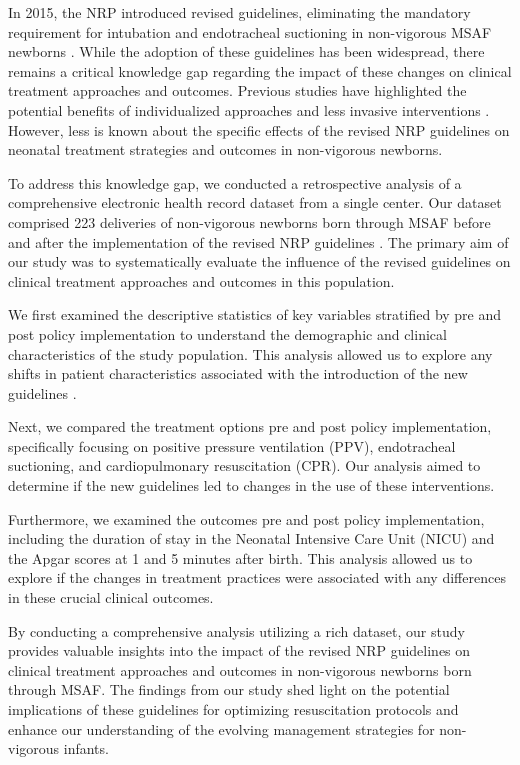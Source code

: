 \documentclass[11pt]{article}
\begin{document}
In 2015, the NRP introduced revised guidelines, eliminating the mandatory requirement for intubation and endotracheal suctioning in non-vigorous MSAF newborns \cite{Hall2005MorphineHA, Chu2014NeurologicalCA}. While the adoption of these guidelines has been widespread, there remains a critical knowledge gap regarding the impact of these changes on clinical treatment approaches and outcomes. Previous studies have highlighted the potential benefits of individualized approaches and less invasive interventions \cite{Kurland2013AnOA, Patel2013EarlyCT}. However, less is known about the specific effects of the revised NRP guidelines on neonatal treatment strategies and outcomes in non-vigorous newborns.

To address this knowledge gap, we conducted a retrospective analysis of a comprehensive electronic health record dataset from a single center. Our dataset comprised 223 deliveries of non-vigorous newborns born through MSAF before and after the implementation of the revised NRP guidelines \cite{Cutumisu2018GrowthMM, Ades2016UpdateOS}. The primary aim of our study was to systematically evaluate the influence of the revised guidelines on clinical treatment approaches and outcomes in this population.

We first examined the descriptive statistics of key variables stratified by pre and post policy implementation to understand the demographic and clinical characteristics of the study population. This analysis allowed us to explore any shifts in patient characteristics associated with the introduction of the new guidelines \cite{Vandenbussche2005TheEO, Zhang2016ClinicalOO}.

Next, we compared the treatment options pre and post policy implementation, specifically focusing on positive pressure ventilation (PPV), endotracheal suctioning, and cardiopulmonary resuscitation (CPR). Our analysis aimed to determine if the new guidelines led to changes in the use of these interventions.

Furthermore, we examined the outcomes pre and post policy implementation, including the duration of stay in the Neonatal Intensive Care Unit (NICU) and the Apgar scores at 1 and 5 minutes after birth. This analysis allowed us to explore if the changes in treatment practices were associated with any differences in these crucial clinical outcomes.

By conducting a comprehensive analysis utilizing a rich dataset, our study provides valuable insights into the impact of the revised NRP guidelines on clinical treatment approaches and outcomes in non-vigorous newborns born through MSAF. The findings from our study shed light on the potential implications of these guidelines for optimizing resuscitation protocols and enhance our understanding of the evolving management strategies for non-vigorous infants.
\end{document}
